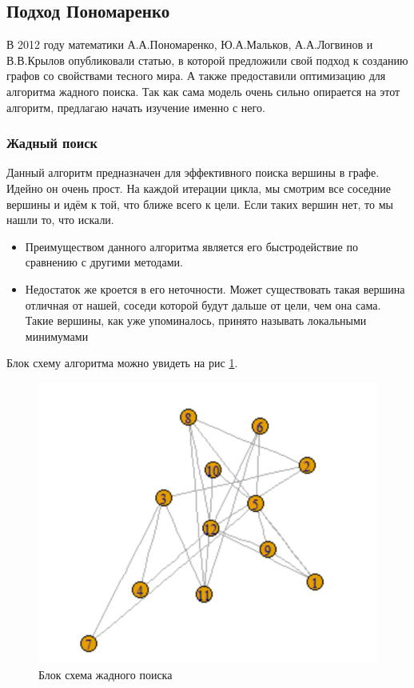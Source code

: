 \subsection{Подход Пономаренко}

В 2012 году математики А.А.Пономаренко, Ю.А.Мальков, А.А.Логвинов и В.В.Крылов
опубликовали статью, в которой предложили свой подход к созданию графов со свойствами 
тесного мира. А также предоставили оптимизацию для алгоритма жадного поиска. Так как сама модель
очень сильно опирается на этот алгоритм, предлагаю начать изучение именно с него.

\subsubsection{Жадный поиск}
Данный алгоритм предназначен для эффективного поиска вершины в графе. Идейно он очень прост.
На каждой итерации цикла, мы смотрим все соседние вершины и идём к той, что ближе всего к цели.
Если таких вершин нет, то мы нашли то, что искали.

\begin{itemize}
    \item Преимуществом данного алгоритма является его быстродействие по сравнению с другими методами. 
    \item Недостаток же кроется в его неточности. Может существовать такая вершина отличная
    от нашей, соседи которой будут дальше от цели, чем она сама. Такие вершины, как уже упоминалось,
    принято называть локальными минимумами 
\end{itemize}

Блок схему алгоритма можно увидеть на рис \ref{grady_search_block_scheme}. 

\begin{figure}[H]
    \centering
    \includegraphics[scale=0.3]{./pictures/random_graph.png}
    \caption{Блок схема жадного поиска} \label{grady_search_block_scheme}
\end{figure}

